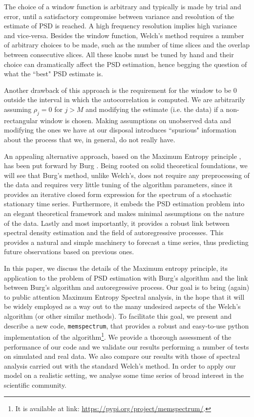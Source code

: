 \documentclass[twocolumn,showpacs,preprintnumbers,nofootinbib,prd,
superscriptaddress,10pt]{revtex4-1}
\begin{document}
The choice of a window function is arbitrary and typically is made by trial and error, until a satisfactory compromise between variance and resolution of the estimate of PSD is reached. A high frequency resolution implies high variance and vice-versa.
Besides the window function, Welch's method requires a number of arbitrary choices to be made, such as the number of time slices and the overlap between consecutive slices. All these knobs must be tuned by hand and their choice can dramatically affect the PSD estimation, hence begging the question of what the ``best" PSD estimate is.

Another drawback of this approach is the requirement for the window to be $0$ outside the interval in which the autocorrelation is computed.
We are arbitrarily assuming $\rho_j = 0$ for $j > M$ and modifying the estimate (i.e. the data) if a non-rectangular window is chosen.
Making assumptions on unobserved data and modifying the ones we have at our disposal introduces ``spurious" information about the process that we, in general, do not really have.

An appealing alternative approach, based on the Maximum Entropy principle \cite{JaynesArticle,jaynes2003ptl, Jaynes_MAXENT}, has been put forward by Burg \cite{burg1975maximum}. Being rooted on solid theoretical foundations, we will see that Burg's method, unlike Welch's, does not require any preprocessing of the data and requires very little tuning of the algorithm parameters, since it provides an iterative closed form expression for the spectrum of a stochastic stationary time series. Furthermore, it embeds the PSD estimation problem into an elegant theoretical framework and makes minimal assumptions on the nature of the data.
Lastly and most importantly, it provides a robust link between spectral density estimation and the field of autoregressive processes. This provides a natural and simple machinery to forecast a time series, thus predicting future observations based on previous ones.

In this paper, we discuss the details of the Maximum entropy principle, its application to the problem of PSD estimation with Burg's algorithm and the link between Burg's algorithm and autoregressive process.
Our goal is to bring (again) to public attention Maximum Entropy Spectral analysis, in the hope that it will be widely employed as a way out to the many undesired aspects of the Welch's algorithm (or other similar methods).
To facilitate this goal, we present and describe a new code, \texttt{memspectrum}, that provides a robust and easy-to-use python implementation of the algorithm\footnote{
It is available at link: \url{https://pypi.org/project/memspectrum/}.
}.
We provide a thorough assessment of the performance of our code and we validate our results performing a number of tests on simulated and real data.
We also compare our results with those of spectral analysis carried out with the standard Welch's method.
In order to apply our model on a realistic setting, we analyse some time series of broad interest in the scientific community.
\end{document}
